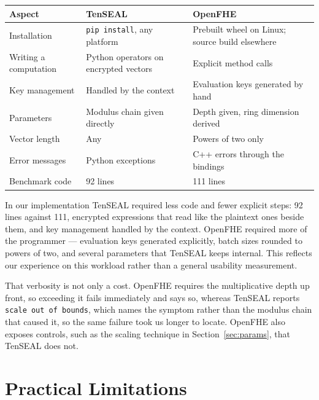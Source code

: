 \documentclass[11pt,a4paper]{article}
\begin{document}
\begin{table}[H]\centering\small
\begin{tabular}{@{}lll@{}}
\toprule
\textbf{Aspect} & \textbf{TenSEAL} & \textbf{OpenFHE} \\
\midrule
Installation      & \texttt{pip install}, any platform & Prebuilt wheel on Linux; source build elsewhere \\
Writing a computation & Python operators on encrypted vectors & Explicit method calls \\
Key management    & Handled by the context & Evaluation keys generated by hand \\
Parameters        & Modulus chain given directly & Depth given, ring dimension derived \\
Vector length     & Any & Powers of two only \\
Error messages    & Python exceptions & C++ errors through the bindings \\
Benchmark code    & 92 lines & 111 lines \\
\bottomrule
\end{tabular}
\end{table}

In our implementation TenSEAL required less code and fewer explicit steps: 92 lines
against 111, encrypted expressions that read like the plaintext ones beside them, and
key management handled by the context. OpenFHE required more of the programmer ---
evaluation keys generated explicitly, batch sizes rounded to powers of two, and
several parameters that TenSEAL keeps internal. This reflects our experience on this
workload rather than a general usability measurement.

That verbosity is not only a cost. OpenFHE requires the multiplicative depth up
front, so exceeding it fails immediately and says so, whereas TenSEAL reports
\texttt{scale out of bounds}, which names the symptom rather than the modulus chain
that caused it, so the same failure took us longer to locate. OpenFHE also exposes
controls, such as the scaling technique in Section~\ref{sec:params}, that TenSEAL
does not.

\section{Practical Limitations}\label{sec:limits}
\end{document}
